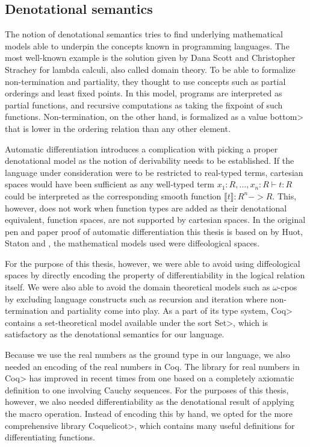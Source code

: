 \subsection{Denotational semantics}

The notion of denotational semantics tries to find underlying mathematical models able to underpin the concepts known in programming languages. The most well-known example is the solution given by Dana Scott and Christopher Strachey\cite{Scott1977} for lambda calculi, also called domain theory.
To be able to formalize non-termination and partiality, they thought to use concepts such as partial orderings and least fixed points\cite{aaby2020}.
In this model, programs are interpreted as partial functions, and recursive computations as taking the fixpoint of such functions.
Non-termination, on the other hand, is formalized as a value \<bottom> that is lower in the ordering relation than any other element.

Automatic differentiation introduces a complication with picking a proper denotational model as the notion of derivability needs to be established.
If the language under consideration were to be restricted to real-typed terms, cartesian spaces would have been sufficient as any well-typed term $x_1 : R, \dots, x_n : R \vdash t : R$ could be interpreted as the corresponding smooth function $\llbracket t \rrbracket : R^n -> R$.
This, however, does not work when function types are added as their denotational equivalent, function spaces, are not supported by cartesian spaces\cite{huot2020correctness}.
In the original pen and paper proof of automatic differentiation this thesis is based on by Huot, Staton and \Vakar{}\cite{huot2020correctness}, the mathematical models used were diffeological spaces.

For the purpose of this thesis, however, we were able to avoid using diffeological spaces by directly encoding the property of differentiability in the logical relation itself.
We were also able to avoid the domain theoretical models such as $\omega$-cpos by excluding language constructs such as recursion and iteration where non-termination and partiality come into play.
As a part of its type system, \<Coq> contains a set-theoretical model available under the sort \<Set>, which is satisfactory as the denotational semantics for our language.

Because we use the real numbers as the ground type in our language, we also needed an encoding of the real numbers in Coq.
The library for real numbers in \<Coq> has improved in recent times from one based on a completely axiomatic definition to one involving Cauchy sequences.
For the purposes of this thesis, however, we also needed differentiability as the denotational result of applying the macro operation.
Instead of encoding this by hand, we opted for the more comprehensive library \<Coquelicot>\cite{Boldo2015CoquelicotAU}, which contains many useful definitions for differentiating functions.
